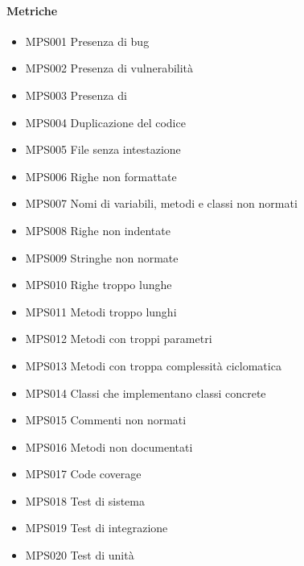 		\paragraph{Metriche}
		\begin{itemize}
			\item MPS001 Presenza di bug
			\item MPS002 Presenza di vulnerabilità
			\item MPS003 Presenza di 
			\item MPS004 Duplicazione del codice
            \item MPS005 File senza intestazione
            \item MPS006 Righe non formattate
            \item MPS007 Nomi di variabili, metodi e classi non normati
            \item MPS008 Righe non indentate
            \item MPS009 Stringhe non normate
            \item MPS010 Righe troppo lunghe
            \item MPS011 Metodi troppo lunghi
            \item MPS012 Metodi con troppi parametri
            \item MPS013 Metodi con troppa complessità ciclomatica
            \item MPS014 Classi che implementano classi concrete
            \item MPS015 Commenti non normati
            \item MPS016 Metodi non documentati
            \item MPS017 Code coverage
            \item MPS018 Test di sistema
            \item MPS019 Test di integrazione
            \item MPS020 Test di unità
		\end{itemize}

